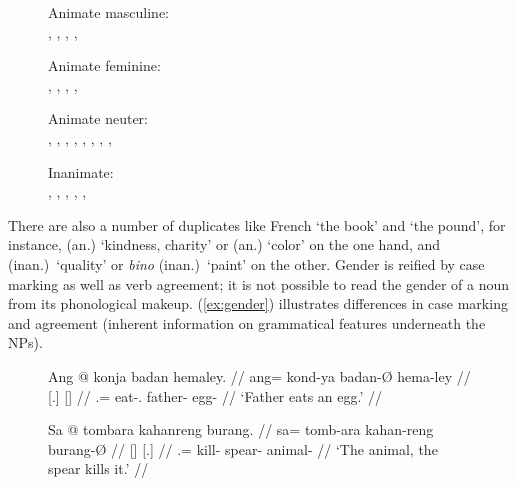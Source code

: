\begin{figure}
\pex\label{ex:noungendex}
	\a Animate masculine:\medskip\\
		, 
		, 
		, 
		, 
	
	\a Animate feminine:\medskip\\
		, 
		, 
		, 
		, 
	
	\a Animate neuter:\medskip\\
		,
		,
		,
		,
		,
		, 
		,
		,
	
	\a Inanimate:\medskip\\
		,
		,
		,
		,
		,
\xe
\end{figure}

There are also a number of duplicates like French  `the book' and
 `the pound', for instance,   (an.) 
`kindness, charity' or   (an.) `color' on the one hand, and
  (inan.)\ `quality' or  \emph{bino} (inan.)\ 
`paint' on the other. Gender is reified by case marking as well as verb
agreement\index{agreement}; it is not possible to read the gender of a noun from its
phonological makeup. (\ref{ex:gender}) illustrates differences in case marking
and agreement\index{agreement} (inherent information on grammatical features underneath the
NPs).

\begin{figure}
\pex\label{ex:gender}
\a\label{ex:gender1}\begingl
	\gla Ang @ konja badan hemaley. //
	\glb ang= kond-ya badan-Ø hema-ley //
	\glc {} {} {\tiny [\TsgM{}.\An{}}] {\tiny [\TsgI{}]} //
	\glc \AgtT{}.\An{}= eat-\TsgM{}.\An{} father-\Top{} egg-\PargI{} //
	\glft `Father eats an egg.' //
\endgl

\a\label{ex:gender2}\begingl
	\gla Sa @ tombara kahanreng burang. //
	\glb sa= tomb-ara kahan-reng burang-Ø //
	\glc {} {} {\tiny [\TsgI{}]} {\tiny [\TsgN{}.\An{}]} //
	\glc \PatT{}.\An{}= kill-\TsgI{} spear-\AargI{} animal-\Top{} //
	\glft `The animal, the spear kills it.' //
\endgl
\xe
\end{figure}

